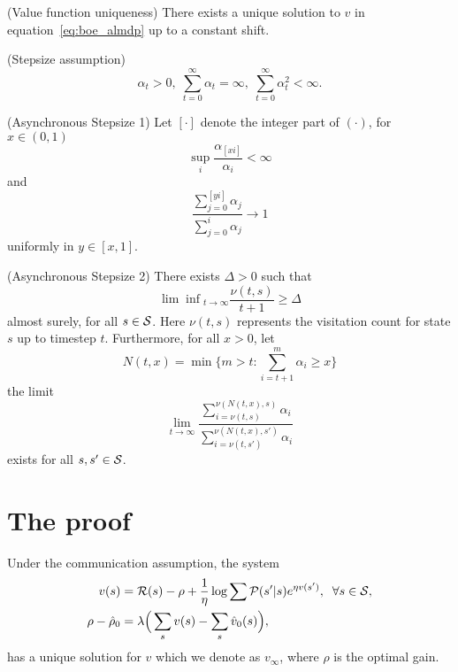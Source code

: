 \begin{assumption}
 (Value function uniqueness) There exists a unique solution to $v$ in equation~\eqref{eq:boe_almdp} up to a constant shift.
  \label{ass:uniqueness}
\end{assumption}
\begin{assumption} (Stepsize assumption)
    \begin{equation*}
        \alpha_t > 0,\;\sum_{t=0}^{\infty} \alpha_t = \infty,\;\sum_{t=0}^{\infty} \alpha_t^2 < \infty.
    \end{equation*}
      \label{ass:stepsize1}
\end{assumption}
\begin{assumption}
    (Asynchronous Stepsize 1) Let $[\cdot]$ denote the integer part of $(\cdot)$, for $x\in(0, 1)$
    \begin{equation*}
        \sup_i \frac{\alpha_{[xi]}}{\alpha_i} < \infty
    \end{equation*}
    and
    \begin{equation*}
        \frac{\sum_{j=0}^{[yi]}\alpha_j}{\sum_{j=0}^i\alpha_j}\rightarrow 1
    \end{equation*}
    \label{ass:stepsize2}
    uniformly in $y \in[x, 1]$.
\end{assumption}

\begin{assumption}
    (Asynchronous Stepsize 2) There exists $\Delta>0$ such that
    \begin{equation*}
        {\lim\inf}_{t\rightarrow\infty} \frac{\nu(t, s)}{t+1}\geq \Delta
    \end{equation*}
    almost surely, for all $s\in\mathcal{S}$. Here $\nu(t, s)$ represents the visitation count for state $s$ up to timestep $t$. Furthermore, for all $x > 0$, let
    \begin{equation*}
        N(t, x) = \min \Big\{m > t: \sum_{i=t+1}^m \alpha_i \geq x \Big\}
    \end{equation*}
    \label{ass:stepsize3}
    the limit 
    \begin{equation*}
       \lim_{t\rightarrow\infty} \frac{\sum_{i=\nu(t, s)}^{\nu(N(t, x), s)} \alpha_i}{\sum_{i=\nu(t, s')}^{\nu(N(t, x), s')} \alpha_i}
    \end{equation*}
    exists for all $s, s'\in\mathcal{S}$.
\end{assumption}
\section{The proof}
Under the communication assumption, the system
\begin{align}
    v(s) &= \mathcal{R}(s) - \rho + \frac{1}{\eta} \log \sum {\mathcal{P}(s'\lvert s) e^{\eta v(s')}},\;\;\forall s\in\mathcal{S}, \\
    \rho - \hat\rho_0 &= \lambda \Big(\sum_s v(s) - \sum_s\hat v_0(s)\Big),
\end{align}
has a unique solution for $v$ which we denote as $v_\infty$, where $\rho$ is the optimal gain.


